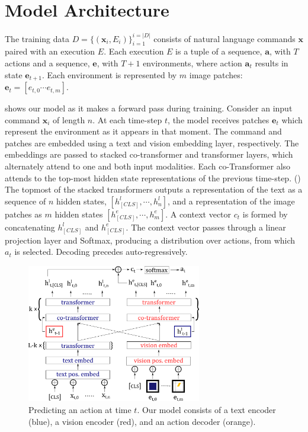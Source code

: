 \documentclass[11pt]{article}
\begin{document}
\section{Model Architecture}
The training data $D=\{(\mathbf{x}_i, E_i) \}_{i=1}^{i=|D|}$ consists of natural language commands $\mathbf{x}$ paired with an execution $E$. 
%
Each execution $E$ is a tuple of a sequence, $\mathbf{a}$, with $T$ actions and a sequence, $\mathbf{e}$, with $T+1$ environments, where action $\mathbf{a}_t$ results in state  $\mathbf{e}_{t+1}$. 
%
Each environment is represented by $m$ image patches: $\mathbf{e}_{t} = [e_{t,0}\cdots e_{t,m}]$.
%

 shows our model as it makes a forward pass during training.
%
Consider an input command $\mathbf{x}_{i}$ of length $n$.
%
At each time-step $t$, the model receives patches $\mathbf{e}_t$ which represent the environment as it appears in that moment. 
%
The command and patches are embedded using a text and vision embedding layer, respectively. 
%
The embeddings are passed to stacked co-transformer and transformer layers, which alternately attend to one and both input modalities.
%
Each co-Transformer also attends to the top-most hidden state representations of the previous time-step.
%
()
%
The topmost of the stacked transformers outputs a representation of the text as a sequence of $n$ hidden states, $[h_{[CLS]}^l,\cdots,h_{n}^l]$, and a representation of the image patches as $m$ hidden states $[h^e_{[CLS]}, \cdots, h^{e}_{m}]$.
%
A context vector $c_t$ is formed by concatenating $h_{[CLS]}^l$ and $h_{[CLS]}^e$.
%
The context vector passes through a linear projection layer and Softmax, producing a distribution over actions, from which $a_t$ is selected.
%
Decoding precedes auto-regressively.

\begin{figure}
\includegraphics[width=3in]{training_model.png}
\caption{Predicting an action at time $t$. Our model consists of a text encoder (blue), a vision encoder (red), and an action decoder (orange). }
\label{fig:training_model}	
\end{figure}
\end{document}
